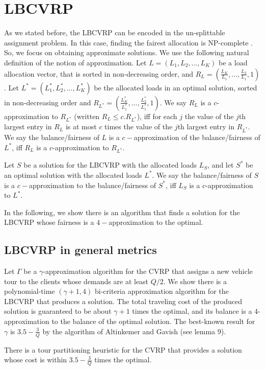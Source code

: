 \section{LBCVRP}
 \noindent As we stated before, the LBCVRP can be encoded in the un-splittable assignment problem. In this case, finding the fairest allocation is NP-complete \cite{Lenstra}. So, we focus on obtaining approximate solutions. We use the following natural definition of the notion of approximation. Let $L=({L_1},{L_2},...,{L_K})$ be a load allocation vector, that is sorted in non-decreasing order, and $R_L = (\frac{L_K}{L_1},...,\frac{L_2}{L_1},1)$. Let $L^*=(L^*_1, L^*_2,...,L^*_K)$ be the allocated loads in an optimal solution, sorted in non-decreasing order and $R_{L^*} = (\frac{L^*_K}{L^*_1},...,\frac{L^*_2}{L^*_1},1)$. We say $R_L$ is a $c$-approximation to $R_{L^*}$ (written $R_L \le c. R_{L^*}$), iff for each $j$ the value of the $j$th largest entry in $R_L$ is at most $c$ times the value of the $j$th largest entry in $R_{L^*}$. We say the balance/fairness of $L$ is a $c-$approximation of the balance/fairness of $L^*$, iff $R_L$ is a $c$-approximation to $R_{L^*}$. 
 \begin{definition} Let $S$ be a solution for the LBCVRP with the allocated loads $L_S$, and let $S^*$ be an optimal solution with the allocated loads $L^*$. We say the balance/fairness of $S$ is a $c-$approximation to the balance/fairness of $S^*$, iff $L_S$ is a $c$-approximation to $L^*$. 
\end{definition} 

 \indent In the following, we show there is an algorithm that finds a solution for the LBCVRP whose fairness is a $4-$approximation to the optimal.
  \subsection{LBCVRP in general metrics}
  \indent Let $\Gamma$ be a $\gamma$-approximation algorithm for the CVRP that assigns a new vehicle tour to the clients whose demands are at least $Q/2$. We show there is a polynomial-time $(\gamma +1,4)$ bi-criteria approximation algorithm for the LBCVRP that produces a solution. The total traveling cost of the produced solution is guaranteed to be about $\gamma+1$ times the optimal, and its balance is a 4-approximation to the balance of the optimal solution. The best-known result for $\gamma$ is $3.5-\frac{3}{Q}$ by the algorithm of Altinkemer and Gavish \cite{Altinkemer1987} (see lemma 9). 
 \begin{lemma}  \cite{Altinkemer1987}
There is a tour partitioning heuristic for the CVRP that provides a solution whose cost is within $3.5-\frac{3}{Q}$ times the optimal.
\end{lemma} 

